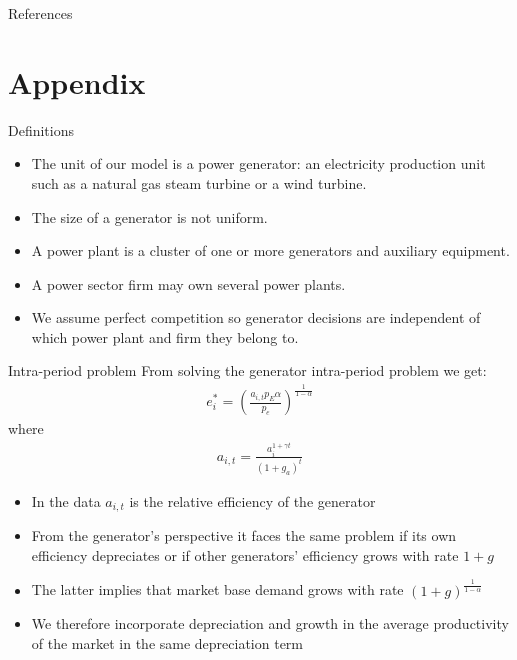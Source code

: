 \documentclass{beamer}
\begin{document}
\begin{frame}[allowframebreaks]{References}
\tiny
    
\end{frame}






\appendix
\section*{Appendix}


\begin{frame}{Definitions}\label{definitions}

\begin{itemize}
 \item The unit of our model is a power generator: an electricity production unit such as a natural gas steam turbine or a wind turbine.
 \item The size of a generator is not uniform.
 \item A power plant is a cluster of one or more generators and auxiliary equipment.
 \item A power sector firm may own several power plants.
 \item We assume perfect competition so generator decisions are independent of which power plant and firm they belong to.
\end{itemize}
\hyperlink{model_struct}{}   
    
\end{frame}
\begin{frame}{Intra-period problem}\label{intra_period}
\footnotesize
    From solving the generator intra-period problem we get:\\
    \begin{align*}
        e_i^* = (\frac{a_{i,t}p_E\alpha}{p_e})^\frac{1}{1-\alpha}
    \end{align*}
    where \begin{align*}
        a_{i,t}=\frac{a_{i}^{1+\gamma t}}{(1+g_a)^t}
    \end{align*}
    \begin{itemize} 
        \item In the data $a_{i,t}$ is the relative efficiency of the generator
        \item From the generator's perspective it faces the same problem if its own efficiency depreciates or if other generators' efficiency grows with rate $1+g$  
        \item The latter implies that market base demand grows with rate $(1+g)^\frac{1}{1-\alpha}$
        \item We therefore incorporate depreciation and growth in the average productivity of the market in the same depreciation term
    \end{itemize}
    
 \hyperlink{gen_problem}{}    
\end{frame}
\end{document}
